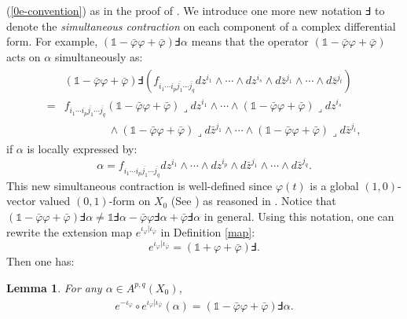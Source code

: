 \documentclass[12pt]{amsart}
\numberwithin{equation}{section}
\newtheorem{lemma}  [theorem]     {Lemma}
\renewcommand{\1}{\mathds{1}}
\renewcommand{\>}{\rightarrow}
\def\o{\overline}
\def\b{\bar}
\def\l{\lrcorner}
\begin{document}
(\ref{0e-convention}) as in the proof of \cite[Lemma $2.8$]{RZ15}.
We introduce one more new notation $\Finv$ to denote the
\emph{simultaneous contraction} on each component of a complex
differential form. For example,
$(\1-\b{\varphi}\varphi+\b{\varphi})\Finv\alpha$ means that the
operator $(\1-\b{\varphi}\varphi+\b{\varphi})$ acts on $\alpha$
simultaneously as:
\begin{align}\label{2.8}
\begin{split}
&(\1-\b{\varphi}\varphi+\b{\varphi})\Finv(f_{i_1\cdots
i_p\o{j_1}\cdots\o{j_q}}dz^{i_1}\wedge\cdots \wedge dz^{i_s}\wedge
d\b{z}^{j_1}\wedge\cdots \wedge d\b{z}^{j_t})
\\
=&f_{i_1\cdots
i_p\o{j_1}\cdots\o{j_q}}(\1-\b{\varphi}\varphi+\b{\varphi})\l
dz^{i_1} \wedge\cdots\wedge(\1-\b{\varphi}\varphi +\b{\varphi})\l
dz^{i_s}
\\&\qquad\quad\quad\wedge(\1-\b{\varphi}\varphi+\b{\varphi})\l
d\b{z}^{j_1}\wedge\cdots\wedge(\1-\b{\varphi}\varphi+\b{\varphi})\l
d\b{z}^{j_t},
\end{split}
\end{align}
if $\alpha$ is locally expressed by:
$$\alpha=f_{i_1\cdots i_p\o{j_1}\cdots\o{j_q}}dz^{i_1}\wedge \cdots\wedge dz^{i_p}\wedge d\b{z}^{j_1}\wedge \cdots\wedge d\b{z}^{j_q}.$$
This new simultaneous contraction is well-defined since $\varphi(t)$
is a  global $(1,0)$-vector valued $(0, 1)$-form on $X_0$ (See
\cite[Pages $150-151$]{MK}) as reasoned in \cite[Proof of Lemma
2.8]{RZ15}. Notice that
$(\1-\b{\varphi}\varphi+\b{\varphi})\Finv\alpha\neq
\1\Finv\alpha-\b{\varphi}\varphi\Finv\alpha+\b{\varphi}\Finv\alpha$
in general. Using this notation, one can rewrite the extension map
$e^{\iota_{\varphi}|\iota_{\b{\varphi}}}$ in Definition \ref{map}:
$$e^{\iota_{\varphi}|\iota_{\b{\varphi}}}=(\1+\varphi+\b{\varphi})\Finv.$$
Then one has:
\begin{lemma}For any $\alpha\in A^{p,q}(X_0)$,
\begin{align}\label{2.3}
  e^{-\iota_{\varphi}}\circ e^{\iota_{\varphi}|\iota_{\b{\varphi}}}(\alpha)=(\1-\b{\varphi}\varphi+\b{\varphi})\Finv\alpha.
\end{align}
\end{lemma}
\end{document}
